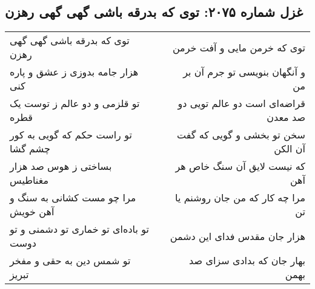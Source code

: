\begin{center}
\section*{غزل شماره ۲۰۷۵: توی که بدرقه باشی گهی گهی رهزن}
\label{sec:2075}
\begin{longtable}{l p{0.5cm} r}
توی که بدرقه باشی گهی گهی رهزن
&&
توی که خرمن مایی و آفت خرمن
\\
هزار جامه بدوزی ز عشق و پاره کنی
&&
و آنگهان بنویسی تو جرم آن بر من
\\
تو قلزمی و دو عالم ز توست یک قطره
&&
قراضه‌ای است دو عالم تویی دو صد معدن
\\
تو راست حکم که گویی به کور چشم گشا
&&
سخن تو بخشی و گویی که گفت آن الکن
\\
بساختی ز هوس صد هزار مغناطیس
&&
که نیست لایق آن سنگ خاص هر آهن
\\
مرا چو مست کشانی به سنگ و آهن خویش
&&
مرا چه کار که من جان روشنم یا تن
\\
تو باده‌ای تو خماری تو دشمنی و تو دوست
&&
هزار جان مقدس فدای این دشمن
\\
تو شمس دین به حقی و مفخر تبریز
&&
بهار جان که بدادی سزای صد بهمن
\\
\end{longtable}
\end{center}
